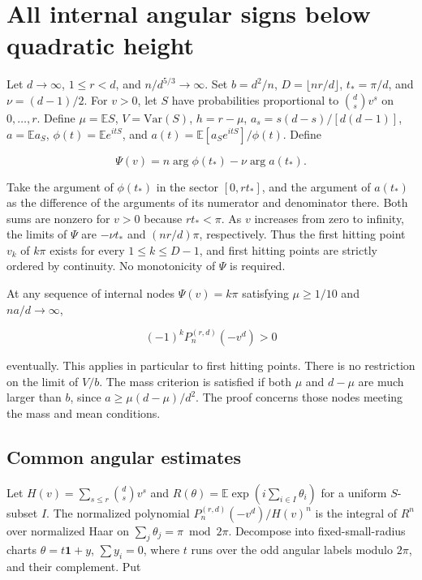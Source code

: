 \section{All internal angular signs below quadratic height}\label{sec:subquadratic-angular-nodes}

Let $d\to\infty$, $1\le r<d$, and $n/d^{5/3}\to\infty$. Set $b=d^2/n$, $D=\lfloor nr/d\rfloor$, $t_*=\pi/d$, and $\nu=(d-1)/2$. For $v>0$, let $S$ have probabilities proportional to $\binom ds v^s$ on $0,\ldots,r$. Define $\mu=\mathbb ES$, $V=\mathrm{Var}(S)$, $h=r-\mu$, $a_s=s(d-s)/[d(d-1)]$, $a=\mathbb E a_S$, $\phi(t)=\mathbb E e^{itS}$, and $a(t)=\mathbb E[a_S e^{itS}]/\phi(t)$. Define

\begin{equation*}
\Psi(v)=n\arg\phi(t_*)-\nu\arg a(t_*).
\end{equation*}

Take the argument of $\phi(t_*)$ in the sector $[0,rt_*]$, and the argument of $a(t_*)$ as the difference of the arguments of its numerator and denominator there. Both sums are nonzero for $v>0$ because $rt_*<\pi$. As $v$ increases from zero to infinity, the limits of $\Psi$ are $-\nu t_*$ and $(nr/d)\pi$, respectively. Thus the first hitting point $v_k$ of $k\pi$ exists for every $1\le k\le D-1$, and first hitting points are strictly ordered by continuity. No monotonicity of $\Psi$ is required.

At any sequence of internal nodes $\Psi(v)=k\pi$ satisfying $\mu\ge1/10$ and $na/d\to\infty$,

\begin{equation*}
(-1)^k P_n^{(r,d)}(-v^d)>0
\end{equation*}

eventually. This applies in particular to first hitting points. There is no restriction on the limit of $V/b$. The mass criterion is satisfied if both $\mu$ and $d-\mu$ are much larger than $b$, since $a\ge\mu(d-\mu)/d^2$. The proof concerns those nodes meeting the mass and mean conditions.

\subsection{Common angular estimates}

Let $H(v)=\sum_{s\le r}\binom ds v^s$ and $R(\theta)=\mathbb E\exp(i\sum_{i\in I}\theta_i)$ for a uniform $S$-subset $I$. The normalized polynomial $P_n^{(r,d)}(-v^d)/H(v)^n$ is the integral of $R^n$ over normalized Haar on $\sum_j\theta_j=\pi\bmod2\pi$. Decompose into fixed-small-radius charts $\theta=t\mathbf1+y$, $\sum y_i=0$, where $t$ runs over the odd angular labels modulo $2\pi$, and their complement. Put

